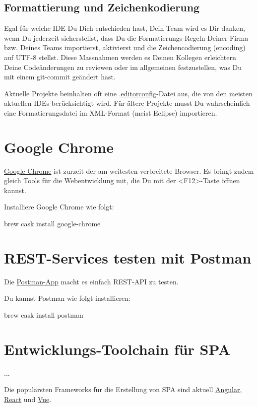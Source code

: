 \documentclass[]{article}
\begin{document}
\subsection{Formattierung und Zeichenkodierung }
Egal für welche IDE Du Dich entschieden hast, Dein Team wird es Dir danken, wenn Du jederzeit sicherstellst, dass Du die Formatierungs-Regeln Deiner Firma bzw. Deines Teams importierst, aktivierst und die Zeichencodierung (encoding) auf UTF-8 stellst. Diese Massnahmen werden es Deinen Kollegen erleichtern Deine Codeänderungen zu reviewen oder im allgemeinen festzustellen, was Du mit einem git-commit geändert hast.

Aktuelle Projekte beinhalten oft eine \href{https://editorconfig.org/}{.editorconfig}-Datei aus, die von den meisten aktuellen IDEs berücksichtigt wird. Für ältere Projekte musst Du wahrscheinlich eine Formatierungsdatei im XML-Format (meist Eclipse) importieren.

\section{Google Chrome}
\href{https://www.google.com/chrome/}{Google Chrome} ist zurzeit der am weitesten verbreitete Browser. Es bringt zudem gleich Tools für die Webentwicklung mit, die Du mit der <F12>-Taste öffnen kannst.

Installiere Google Chrome wie folgt:
\begin{bashcode}
brew cask install google-chrome
\end{bashcode}


\section{REST-Services testen mit Postman}
Die \href{https://www.getpostman.com/products}{Postman-App} macht es einfach REST-API zu testen. 

Du kannst Postman wie folgt installieren:
\begin{bashcode}
brew cask install postman
\end{bashcode}

\section{Entwicklungs-Toolchain für SPA}
...

Die populärsten Frameworks für die Erstellung von SPA sind aktuell \href{https://angular.io/}{Angular}, \href{https://reactjs.org/}{React} und \href{https://vuejs.org/}{Vue}.
\end{document}
